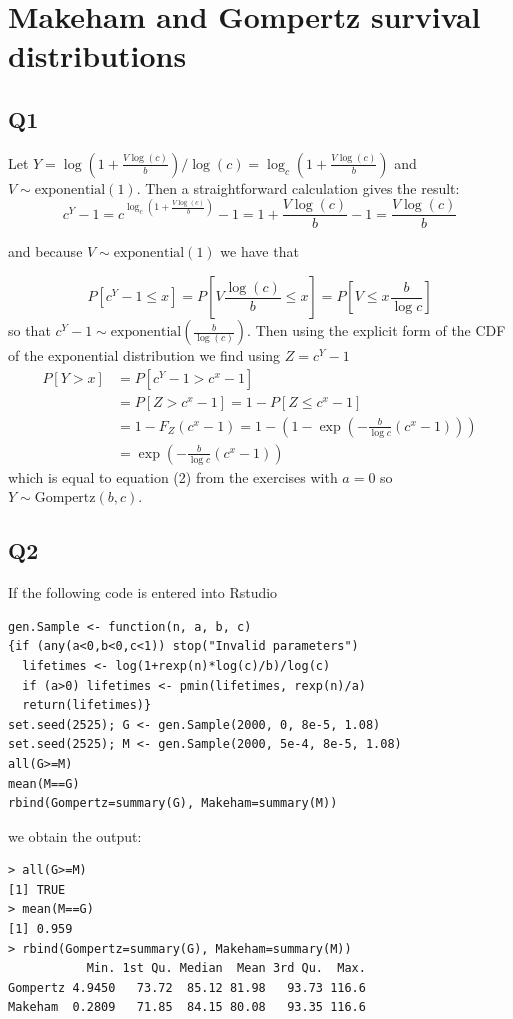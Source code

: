
\section*{Makeham and Gompertz survival distributions}

\subsection*{Q1}

Let $Y = \log(1+\frac{V \log(c)}{b}) / \log(c) = \log_c(1+\frac{V \log(c)}{b})$ and $V \sim \text{exponential}(1)$. Then a straightforward calculation gives the result:
\begin{equation}
c^Y - 1 = c^{ \log_c(1+\frac{V \log(c)}{b})} - 1 = 1+\frac{V\log(c)}{b} - 1 = \frac{V \log(c)}{b}
\end{equation}

and because $V \sim \text{exponential}(1)$ we have that

\begin{equation}
P[c^Y - 1 \le x ] = P[V \frac{\log(c)}{b} \le x ] = P[V \le x \frac{b}{\log{c}}] 
\end{equation}
so that $c^Y - 1 \sim \text{exponential}( \frac{b}{\log(c)})$. Then using the explicit form of the CDF of the exponential distribution we find using $Z = c^Y - 1 $
\begin{equation}
\begin{split}
P[Y > x] & = P[c^Y - 1 > c^x - 1] \\ 
		 & = P[Z > c^x - 1] = 1- P[Z \le c^x - 1]  \\
		 & = 1 - F_Z(c^x - 1) = 1 - (1-\exp(-\frac{b}{\log c} (c^x - 1))) \\
	     & = \exp(-\frac{b}{\log c} (c^x - 1))
\end{split}
\end{equation}
which is equal to equation (2) from the exercises with $a = 0$ so $ Y \sim \text{Gompertz}(b,c)$.

\subsection*{Q2}
If the following code is entered into Rstudio
\begin{verbatim}
gen.Sample <- function(n, a, b, c)
{if (any(a<0,b<0,c<1)) stop("Invalid parameters")
  lifetimes <- log(1+rexp(n)*log(c)/b)/log(c)
  if (a>0) lifetimes <- pmin(lifetimes, rexp(n)/a)
  return(lifetimes)}
set.seed(2525); G <- gen.Sample(2000, 0, 8e-5, 1.08)
set.seed(2525); M <- gen.Sample(2000, 5e-4, 8e-5, 1.08)
all(G>=M) 
mean(M==G) 
rbind(Gompertz=summary(G), Makeham=summary(M))
\end{verbatim}
we obtain the output:
\begin{verbatim}
> all(G>=M) 
[1] TRUE
> mean(M==G) 
[1] 0.959
> rbind(Gompertz=summary(G), Makeham=summary(M))
           Min. 1st Qu. Median  Mean 3rd Qu.  Max.
Gompertz 4.9450   73.72  85.12 81.98   93.73 116.6
Makeham  0.2809   71.85  84.15 80.08   93.35 116.6
\end{verbatim}


